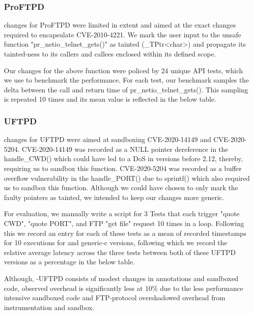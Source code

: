 \subsubsection{\textbf{ProFTPD}}
\systemname changes for ProFTPD were limited in extent and aimed at the exact changes required to encapsulate CVE-2010-4221. We mark the user input to the unsafe function "pr\_netio\_telnet\_gets()" as tainted (\_TPtr<char>) and propagate its tainted-ness to its callers and callees enclosed within its defined scope.

Our changes for the above function were policed by 24 unique API tests, which we use to benchmark the performance. For each test, our benchmark samples the delta between the call and return time of pr\_netio\_telnet\_gets(). This sampling is repeated 10 times and its mean value is reflected in the below table.

\subsubsection{\textbf{UFTPD}}
\systemname changes for UFTPD were aimed at sandboxing CVE-2020-14149 and CVE-2020-5204. CVE-2020-14149 was recorded as a NULL pointer dereference in the handle\_CWD() which could have led to a DoS in versions before 2.12, thereby, requiring us to sandbox this function. CVE-2020-5204 was recorded as a buffer overflow vulnerability in the handle\_PORT() due to sprintf() which also required us to sandbox this function. Although we could have chosen to only mark the faulty pointers as tainted, we intended to keep our changes more generic.

For evaluation, we manually write a script for 3 Tests that each trigger "quote CWD", "quote PORT", and FTP "get file" request 10 times in a loop. Following this we record an entry for each of these tests as a mean of recorded timestamps for 10 executions for \systemname and generic-c versions, following which we record the relative average latency across the three tests between both of these UFTPD versions as a percentage in the below table.   

Although, \systemname-UFTPD consists of modest changes in annotations and sandboxed code, observed overhead is significantly less at 10\% due to the less performance intensive sandboxed code and FTP-protocol overshadowed overhead from \systemname instrumentation and sandbox.     


